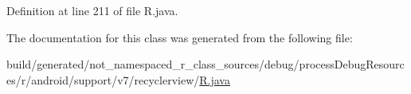Definition at line 211 of file R.\+java.



The documentation for this class was generated from the following file\+:\begin{DoxyCompactItemize}
\item 
build/generated/not\+\_\+namespaced\+\_\+r\+\_\+class\+\_\+sources/debug/process\+Debug\+Resources/r/android/support/v7/recyclerview/\mbox{\hyperlink{android_2support_2v7_2recyclerview_2_r_8java}{R.\+java}}\end{DoxyCompactItemize}
